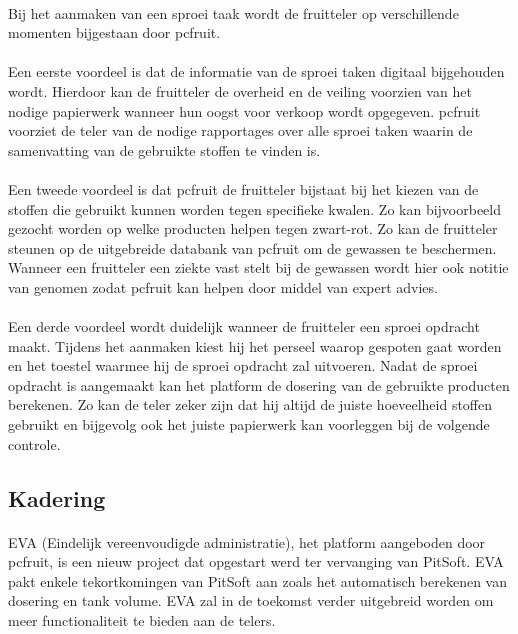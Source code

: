 \paragraph {} Bij het aanmaken van een sproei taak wordt de fruitteler op verschillende
momenten bijgestaan door pcfruit.

\paragraph {} Een eerste voordeel is dat de informatie van de sproei taken digitaal
bijgehouden wordt.  Hierdoor kan de fruitteler de overheid en de veiling voorzien van het
nodige papierwerk wanneer hun oogst voor verkoop wordt opgegeven. pcfruit voorziet de
teler van de nodige rapportages over alle sproei taken waarin de samenvatting van de
gebruikte stoffen te vinden is.

\paragraph {} Een tweede voordeel is dat pcfruit de fruitteler bijstaat bij het kiezen van de
stoffen die gebruikt kunnen worden tegen specifieke kwalen. Zo kan bijvoorbeeld gezocht
worden op welke producten helpen tegen zwart-rot. Zo kan de fruitteler steunen op de
uitgebreide databank van pcfruit om de gewassen te beschermen. Wanneer een fruitteler een
ziekte vast stelt bij de gewassen wordt hier ook notitie van genomen zodat pcfruit kan
helpen door middel van expert advies.

\paragraph {} Een derde voordeel wordt duidelijk wanneer de fruitteler een sproei opdracht
maakt. Tijdens het aanmaken kiest hij het perseel waarop gespoten gaat worden en het
toestel waarmee hij de sproei opdracht zal uitvoeren. Nadat de sproei opdracht is
aangemaakt kan het platform de dosering van de gebruikte producten berekenen. Zo kan de
teler zeker zijn dat hij altijd de juiste hoeveelheid stoffen gebruikt en bijgevolg ook
het juiste papierwerk kan voorleggen bij de volgende controle.


\subsection {Kadering}

\paragraph {} EVA (Eindelijk vereenvoudigde administratie), het platform aangeboden door
pcfruit, is een nieuw project dat opgestart werd ter vervanging van PitSoft. EVA pakt
enkele tekortkomingen van PitSoft aan zoals het automatisch berekenen van dosering en tank
volume. EVA zal in de toekomst verder uitgebreid worden om meer functionaliteit te bieden
aan de telers.

